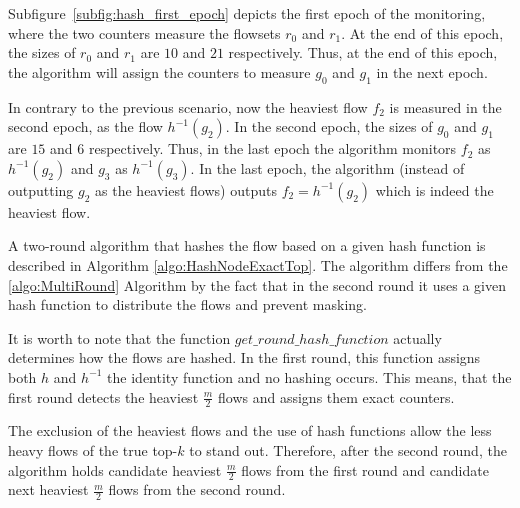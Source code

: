 Subfigure~\ref{subfig:hash_first_epoch} depicts the first epoch of the monitoring, where the two counters measure the flowsets $r_0$ and $r_1$. At the end of this epoch, the sizes of $r_0$ and $r_1$ are $10$ and $21$ respectively. Thus, at the end of this epoch, the algorithm will assign the counters to measure $g_0$ and $g_1$ in the next epoch.

In contrary to the previous scenario, now the heaviest flow $f_2$ is measured in the second epoch, as the flow $h^{-1}(g_2)$. In the second epoch, the sizes of $g_0$ and $g_1$ are $15$ and $6$ respectively. Thus, in the last epoch the algorithm monitors $f_2$ as $h^{-1}(g_2)$ and $g_3$ as $h^{-1}(g_3)$. In the last epoch, the algorithm (instead of outputting $g_2$ as the heaviest flows) outputs $f_2=h^{-1}(g_2)$ which is indeed the heaviest flow.

A two-round algorithm that hashes the flow based on a given hash function is described in Algorithm \ref{algo:HashNodeExactTop}. The algorithm differs from the \ref{algo:MultiRound} Algorithm by the fact that in the second round it uses a given hash function to distribute the flows and prevent masking.

It is worth to note that the function $get\_round\_hash\_function$ actually determines how the flows are hashed. In the first round, this function assigns both $h$ and $h^{-1}$ the identity function and no hashing occurs. This means, that the first round detects the heaviest $\frac{m}{2}$ flows and assigns them exact counters.

The exclusion of the heaviest flows and the use of hash functions allow the less heavy flows of the true top-$k$ to stand out. Therefore, after the second round, the algorithm holds candidate heaviest $\frac{m}{2}$ flows from the first round and candidate next heaviest $\frac{m}{2}$ flows from the second round.

